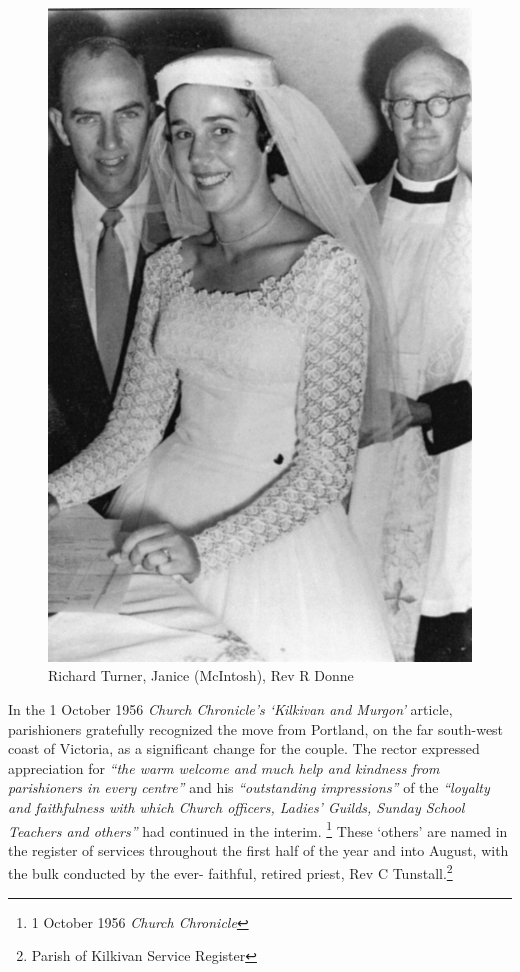 \begin{figure}
\begin{center}
\includegraphics[width=1.\linewidth,center]{../images/Donne.jpg}
\caption{Richard Turner, Janice (McIntosh), Rev R Donne}
\end{center}
\end{figure}




In the 1 October 1956 \emph{Church Chronicle's `Kilkivan and Murgon'} article, parishioners gratefully recognized the move from Portland, on the far south-west coast of Victoria, as a significant change for the couple. The rector expressed appreciation for \emph{``the warm welcome and much help and kindness from parishioners in every centre''} and his \emph{``outstanding impressions''} of the \emph{``loyalty and faithfulness with which Church officers, Ladies' Guilds, Sunday School Teachers and others''} had continued in the interim. \footnote{1 October 1956 \emph{Church Chronicle}} These `others' are named in the register of services throughout the first half of the year and into August, with the bulk conducted by the ever- faithful, retired priest, Rev C Tunstall.\footnote{Parish of Kilkivan Service Register}



